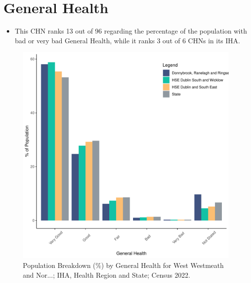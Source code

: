 \documentclass{article}
\begin{document}
\pagebreak

\section{General Health}\label{sect:GenHealth}
\begin{itemize}
\item  This CHN ranks  13 out of 96 regarding the percentage of the population with bad or very bad General Health, while it ranks   3 out of 6 CHNs in its IHA.
\end{itemize}
\begin{figure}[h]
	\centering
	\includegraphics[width = 150mm]{../figures/GenED.pdf}
	\caption{Population Breakdown (\%) by General Health for West Westmeath and Nor...; IHA, Health Region and State;  Census 2022.}
	\label{fig:2ae19629-1a6a-13a3-e055-000000000001}
	\end{figure}
\end{document}
